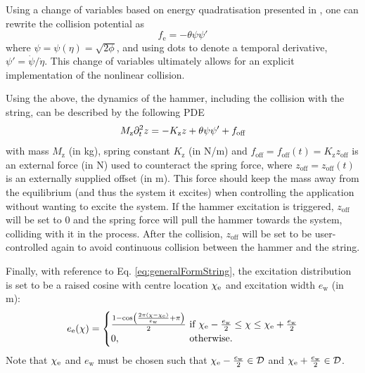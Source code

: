 \documentclass{article}
\begin{document}
Using a change of variables based on energy quadratisation presented in \cite{Ducceschi2021}, one can rewrite the collision potential as
\begin{equation}
    f_\text{e} = -\theta\psi \psi'
\end{equation}
where $\psi = \psi(\eta) = \sqrt{2\phi}$, and using dots to denote a temporal derivative, $\psi' = \dot \psi / \dot \eta$. This change of variables ultimately allows for an explicit implementation of the nonlinear collision. 

Using the above, the dynamics of the hammer, including the collision with the string, can be described by the following PDE
\begin{equation}
    M_\text{z}\partial_t^2 z = -K_\text{z} z + \theta \psi\psi' + f_\text{off}
\end{equation}
with mass $M_\text{z}$ (in kg), spring constant $K_\text{z}$ (in N/m) and $f_\text{off} = f_\text{off}(t) = K_\text{z} z_\text{off}$ is an external force (in N) used to counteract the spring force, where $z_\text{off} = z_\text{off}(t)$ is an externally supplied offset (in m). This force should keep the mass away from the equilibrium (and thus the system it excites) when controlling the application without wanting to excite the system. If the hammer excitation is triggered, $z_\text{off}$ will be set to $0$ and the spring force will pull the hammer towards the system, colliding with it in the process. After the collision, $z_\text{off}$ will be set to be user-controlled again to avoid continuous collision between the hammer and the string. 

Finally, with reference to Eq. \eqref{eq:generalFormString}, the excitation distribution is set to be a raised cosine with centre location $\chi_{\text{e}}$ and excitation width $e_\text{w}$ (in m):
\begin{equation}
    e_\etxt(\chi) = \begin{cases}
        \frac{1 - \cos\left(\frac{2\pi (\chi - \chi_\etxt)}{e_\text{w}} + \pi\right)}{2}&\!\!\!\!\text{if}\ \chi_\etxt - \frac{e_\text{w}}{2}\leq \chi \leq \chi_\etxt + \frac{e_\text{w}}{2}\\
        0,& \!\!\!\!\text{otherwise.}
        \end{cases}
\end{equation}
Note that $\chi_{\text{e}} $ and $e_\text{w}$ must be chosen such that $\chi_{\text{e}} - \frac{e_\text{w}}{2}\in \mathcal{D}$ and $\chi_{\text{e}} + \frac{e_\text{w}}{2} \in \mathcal{D}$.
\end{document}
